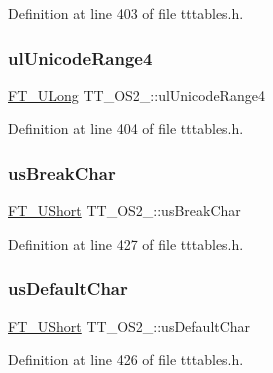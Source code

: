 Definition at line 403 of file tttables.\+h.

\mbox{\label{struct_t_t___o_s2___aebb03683f54edb755fc8f6e39c04e032}} 
\subsubsection{\texorpdfstring{ulUnicodeRange4}{ulUnicodeRange4}}
{\footnotesize\ttfamily \mbox{\hyperlink{fttypes_8h_a4fac88bdba78eb76b505efa6e4fbf3f5}{F\+T\+\_\+\+U\+Long}} T\+T\+\_\+\+O\+S2\+\_\+\+::ul\+Unicode\+Range4}



Definition at line 404 of file tttables.\+h.

\mbox{\label{struct_t_t___o_s2___a1d47030e246d2593ec3e4cdf66b17161}} 
\subsubsection{\texorpdfstring{usBreakChar}{usBreakChar}}
{\footnotesize\ttfamily \mbox{\hyperlink{fttypes_8h_a937f6c17cf5ffd09086d8610c37b9f58}{F\+T\+\_\+\+U\+Short}} T\+T\+\_\+\+O\+S2\+\_\+\+::us\+Break\+Char}



Definition at line 427 of file tttables.\+h.

\mbox{\label{struct_t_t___o_s2___af8639fefeb705a9287df996b224462ea}} 
\subsubsection{\texorpdfstring{usDefaultChar}{usDefaultChar}}
{\footnotesize\ttfamily \mbox{\hyperlink{fttypes_8h_a937f6c17cf5ffd09086d8610c37b9f58}{F\+T\+\_\+\+U\+Short}} T\+T\+\_\+\+O\+S2\+\_\+\+::us\+Default\+Char}



Definition at line 426 of file tttables.\+h.

\mbox{\label{struct_t_t___o_s2___afc118d119301ac11f3a1521a45f855ff}} 
